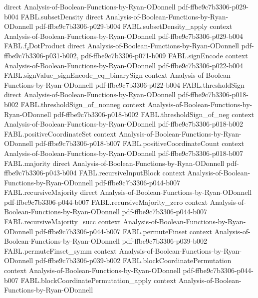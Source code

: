 \begin{theorem}
  {direct}
  {Analysis-of-Boolean-Functions-by-Ryan-ODonnell}
  {pdf-ffbe9c7b3306-p029-b004}
\proofstep
  {FABL.subsetDensity}
  {direct}
  {Analysis-of-Boolean-Functions-by-Ryan-ODonnell}
  {pdf-ffbe9c7b3306-p029-b004}
\proofstep
  {FABL.subsetDensity_apply}
  {context}
  {Analysis-of-Boolean-Functions-by-Ryan-ODonnell}
  {pdf-ffbe9c7b3306-p029-b004}
\proofstep
  {FABL.f₂DotProduct}
  {direct}
  {Analysis-of-Boolean-Functions-by-Ryan-ODonnell}
  {pdf-ffbe9c7b3306-p031-b002,
    pdf-ffbe9c7b3306-p071-b009}
\proofstep
  {FABL.signEncode}
  {context}
  {Analysis-of-Boolean-Functions-by-Ryan-ODonnell}
  {pdf-ffbe9c7b3306-p022-b004}
\proofstep
  {FABL.signValue_signEncode_eq_binarySign}
  {context}
  {Analysis-of-Boolean-Functions-by-Ryan-ODonnell}
  {pdf-ffbe9c7b3306-p022-b004}
\proofstep
  {FABL.thresholdSign}
  {direct}
  {Analysis-of-Boolean-Functions-by-Ryan-ODonnell}
  {pdf-ffbe9c7b3306-p018-b002}
\proofstep
  {FABL.thresholdSign_of_nonneg}
  {context}
  {Analysis-of-Boolean-Functions-by-Ryan-ODonnell}
  {pdf-ffbe9c7b3306-p018-b002}
\proofstep
  {FABL.thresholdSign_of_neg}
  {context}
  {Analysis-of-Boolean-Functions-by-Ryan-ODonnell}
  {pdf-ffbe9c7b3306-p018-b002}
\proofstep
  {FABL.positiveCoordinateSet}
  {context}
  {Analysis-of-Boolean-Functions-by-Ryan-ODonnell}
  {pdf-ffbe9c7b3306-p018-b007}
\proofstep
  {FABL.positiveCoordinateCount}
  {context}
  {Analysis-of-Boolean-Functions-by-Ryan-ODonnell}
  {pdf-ffbe9c7b3306-p018-b007}
\proofstep
  {FABL.majority}
  {direct}
  {Analysis-of-Boolean-Functions-by-Ryan-ODonnell}
  {pdf-ffbe9c7b3306-p043-b004}
\proofstep
  {FABL.recursiveInputBlock}
  {context}
  {Analysis-of-Boolean-Functions-by-Ryan-ODonnell}
  {pdf-ffbe9c7b3306-p044-b007}
\proofstep
  {FABL.recursiveMajority}
  {direct}
  {Analysis-of-Boolean-Functions-by-Ryan-ODonnell}
  {pdf-ffbe9c7b3306-p044-b007}
\proofstep
  {FABL.recursiveMajority_zero}
  {context}
  {Analysis-of-Boolean-Functions-by-Ryan-ODonnell}
  {pdf-ffbe9c7b3306-p044-b007}
\proofstep
  {FABL.recursiveMajority_succ}
  {context}
  {Analysis-of-Boolean-Functions-by-Ryan-ODonnell}
  {pdf-ffbe9c7b3306-p044-b007}
\proofstep
  {FABL.permuteFinset}
  {context}
  {Analysis-of-Boolean-Functions-by-Ryan-ODonnell}
  {pdf-ffbe9c7b3306-p039-b002}
\proofstep
  {FABL.permuteFinset_symm}
  {context}
  {Analysis-of-Boolean-Functions-by-Ryan-ODonnell}
  {pdf-ffbe9c7b3306-p039-b002}
\proofstep
  {FABL.blockCoordinatePermutation}
  {context}
  {Analysis-of-Boolean-Functions-by-Ryan-ODonnell}
  {pdf-ffbe9c7b3306-p044-b007}
\proofstep
  {FABL.blockCoordinatePermutation_apply}
  {context}
  {Analysis-of-Boolean-Functions-by-Ryan-ODonnell}

\end{theorem}
